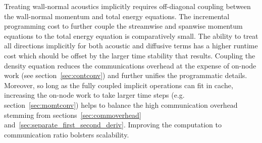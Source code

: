 \documentclass[letterpaper,11pt,nointlimits,reqno,draft]{amsart}
\begin{document}
Treating wall-normal acoustics implicitly requires off-diagonal coupling
between the wall-normal momentum and total energy equations.  The incremental
programming cost to further couple the streamwise and spanwise momentum
equations to the total energy equation is comparatively small.  The ability to
treat all directions implicitly for both acoustic and diffusive terms has a
higher runtime cost which should be offset by the larger time stability that
results.  Coupling the density equation reduces the communications overhead at
the expense of on-node work (see section~\ref{sec:contconv}) and further
unifies the programmatic details.  Moreover, so long as the fully coupled
implicit operations can fit in cache, increasing the on-node work to take
larger time steps (e.g. section~\ref{sec:momtconv}) helps to balance the high
communication overhead stemming from sections~\ref{sec:commoverhead}
and~\ref{sec:separate_first_second_deriv}.  Improving the computation to
communication ratio bolsters scalability.
\end{document}
